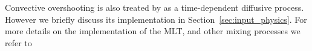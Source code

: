 \documentclass[../../main/thesis_msc.tex]{subfiles}
\begin{document}
					Convective overshooting is also treated by \mesa as a time-dependent diffusive process. However we briefly discuss its implementation in Section \,\ref{sec:input_physics}. For more details on the implementation of the MLT, and other mixing processes we refer to \cite{Paxton2011, Paxton:2013pj}
					
									
    
\end{document}
